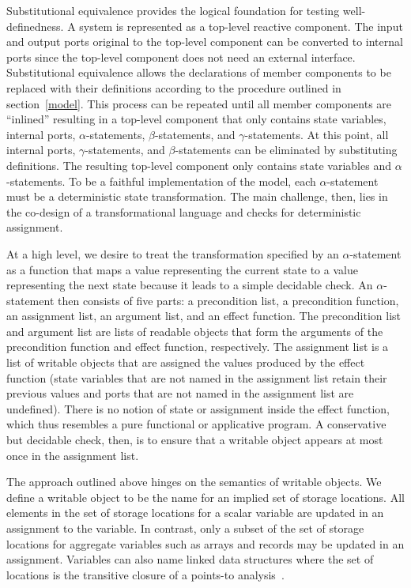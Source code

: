 Substitutional equivalence provides the logical foundation for testing well-definedness.
A system is represented as a top-level reactive component.
The input and output ports original to the top-level component can be converted to internal ports since the top-level component does not need an external interface.
Substitutional equivalence allows the declarations of member components to be replaced with their definitions according to the procedure outlined in section~\ref{model}.
This process can be repeated until all member components are ``inlined'' resulting in a top-level component that only contains state variables, internal ports, $\alpha$-statements, $\beta$-statements, and $\gamma$-statements.
At this point, all internal ports, $\gamma$-statements, and $\beta$-statements can be eliminated by substituting definitions.
The resulting top-level component only contains state variables and $\alpha$-statements.
To be a faithful implementation of the model, each $\alpha$-statement must be a deterministic state transformation.
The main challenge, then, lies in the co-design of a transformational language and checks for deterministic assignment.

At a high level, we desire to treat the transformation specified by an $\alpha$-statement as a function that maps a value representing the current state to a value representing the next state because it leads to a simple decidable check.
An $\alpha$-statement then consists of five parts:  a precondition list, a precondition function, an assignment list, an argument list, and an effect function.
The precondition list and argument list are lists of readable objects that form the arguments of the precondition function and effect function, respectively.
The assignment list is a list of writable objects that are assigned the values produced by the effect function (state variables that are not named in the assignment list retain their previous values and ports that are not named in the assignment list are undefined).
There is no notion of state or assignment inside the effect function, which thus resembles a pure functional or applicative program.
A conservative but decidable check, then, is to ensure that a writable object appears at most once in the assignment list.

The approach outlined above hinges on the semantics of writable objects.
We define a writable object to be the name for an implied set of storage locations.
All elements in the set of storage locations for a scalar variable are updated in an assignment to the variable.
In contrast, only a subset of the set of storage locations for aggregate variables such as arrays and records may be updated in an assignment.
Variables can also name linked data structures where the set of locations is the transitive closure of a points-to analysis~\cite{hind2001pointer}.


